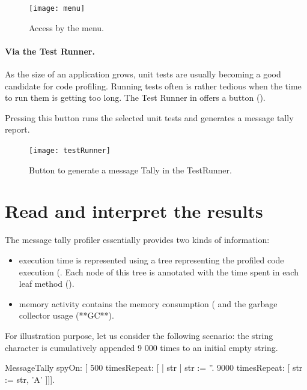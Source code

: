 \documentclass[a4paper,10pt,twoside]{book}
\begin{document}
\begin{figure}[h]
	\begin{center}
	\texttt{[image: menu]}
	\caption{Access by the menu.}
	\end{center}
\end{figure}



\paragraph{Via the Test Runner.}
As the size of an application grows, unit tests are usually becoming a good candidate for code profiling. Running tests often is rather tedious when the time to run them is getting too long. The Test Runner in \pharo offers a button  (). 

Pressing this button runs the selected unit tests and generates a message tally report. 

\begin{figure}[h]
	\begin{center}
	\texttt{[image: testRunner]}
	\caption{Button to generate a message Tally in the TestRunner.}
	\end{center}
\end{figure}


\section{Read and interpret the results} 
The message tally profiler essentially provides two kinds of information:
\begin{itemize}
\item execution time is represented using a tree representing the profiled code execution (. Each node of this tree is annotated with the time spent in each leaf method (). 

\item memory activity contains the memory consumption ( and the garbage collector usage (**GC**).
\end{itemize}

For illustration purpose, let us consider the following scenario: the string character  is cumulatively appended 9 000 times to an initial empty string.

\begin{code}{}
MessageTally spyOn: 
     [ 500 timesRepeat: [
                     | str |  
                     str := ''. 
                     9000 timesRepeat: [ str := str, 'A' ]]].
\end{code} 
\end{document}
